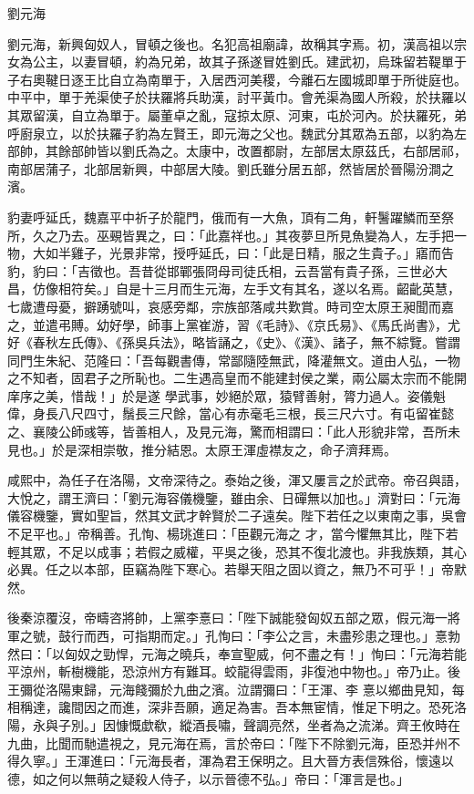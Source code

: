 
\begin{pinyinscope}
劉元海



 劉元海，新興匈奴人，冒頓之後也。名犯高祖廟諱，故稱其字焉。初，漢高祖以宗女為公主，以妻冒頓，約為兄弟，故其子孫遂冒姓劉氏。建武初，烏珠留若鞮單于子右奧鞬日逐王比自立為南單于，入居西河美稷，今離石左國城即單于所徙庭也。中平中，單于羌渠使子於扶羅將兵助漢，討平黃巾。會羌渠為國人所殺，於扶羅以
 其眾留漢，自立為單于。屬董卓之亂，寇掠太原、河東，屯於河內。於扶羅死，弟呼廚泉立，以於扶羅子豹為左賢王，即元海之父也。魏武分其眾為五部，以豹為左部帥，其餘部帥皆以劉氏為之。太康中，改置都尉，左部居太原茲氏，右部居祁，南部居蒲子，北部居新興，中部居大陵。劉氏雖分居五部，然皆居於晉陽汾澗之濱。



 豹妻呼延氏，魏嘉平中祈子於龍門，俄而有一大魚，頂有二角，軒鬐躍鱗而至祭所，久之乃去。巫覡皆異之，曰：「此嘉祥也。」其夜夢旦所見魚變為人，左手把一物，大如半雞子，光景非常，授呼延氏，曰：「此是日精，服之生貴子。」寤而告
 豹，豹曰：「吉徵也。吾昔從邯鄲張冏母司徒氏相，云吾當有貴子孫，三世必大昌，仿像相符矣。」自是十三月而生元海，左手文有其名，遂以名焉。齠齔英慧，七歲遭母憂，擗踴號叫，哀感旁鄰，宗族部落咸共歎賞。時司空太原王昶聞而嘉之，並遣弔賻。幼好學，師事上黨崔游，習《毛詩》、《京氏易》、《馬氏尚書》，尤好《春秋左氏傳》、《孫吳兵法》，略皆誦之，《史》、《漢》、諸子，無不綜覽。嘗謂同門生朱紀、范隆曰：「吾每觀書傳，常鄙隨陸無武，降灌無文。道由人弘，一物之不知者，固君子之所恥也。二生遇高皇而不能建封侯之業，兩公屬太宗而不能開庠序之美，惜哉！」於是遂
 學武事，妙絕於眾，猿臂善射，膂力過人。姿儀魁偉，身長八尺四寸，鬚長三尺餘，當心有赤毫毛三根，長三尺六寸。有屯留崔懿之、襄陵公師彧等，皆善相人，及見元海，驚而相謂曰：「此人形貌非常，吾所未見也。」於是深相崇敬，推分結恩。太原王渾虛襟友之，命子濟拜焉。



 咸熙中，為任子在洛陽，文帝深待之。泰始之後，渾又屢言之於武帝。帝召與語，大悅之，謂王濟曰：「劉元海容儀機鑒，雖由余、日磾無以加也。」濟對曰：「元海儀容機鑒，實如聖旨，然其文武才幹賢於二子遠矣。陛下若任之以東南之事，吳會不足平也。」帝稱善。孔恂、楊珧進曰：「臣觀元海之
 才，當今懼無其比，陛下若輕其眾，不足以成事；若假之威權，平吳之後，恐其不復北渡也。非我族類，其心必異。任之以本部，臣竊為陛下寒心。若舉天阻之固以資之，無乃不可乎！」帝默然。



 後秦涼覆沒，帝疇咨將帥，上黨李憙曰：「陛下誠能發匈奴五部之眾，假元海一將軍之號，鼓行而西，可指期而定。」孔恂曰：「李公之言，未盡殄患之理也。」憙勃然曰：「以匈奴之勁悍，元海之曉兵，奉宣聖威，何不盡之有！」恂曰：「元海若能平涼州，斬樹機能，恐涼州方有難耳。蛟龍得雲雨，非復池中物也。」帝乃止。後王彌從洛陽東歸，元海餞彌於九曲之濱。泣謂彌曰：「王渾、李
 憙以鄉曲見知，每相稱達，讒間因之而進，深非吾願，適足為害。吾本無宦情，惟足下明之。恐死洛陽，永與子別。」因慷慨歔欷，縱酒長嘯，聲調亮然，坐者為之流涕。齊王攸時在九曲，比聞而馳遣視之，見元海在焉，言於帝曰：「陛下不除劉元海，臣恐并州不得久寧。」王渾進曰：「元海長者，渾為君王保明之。且大晉方表信殊俗，懷遠以德，如之何以無萌之疑殺人侍子，以示晉德不弘。」帝曰：「渾言是也。」




\end{pinyinscope}
